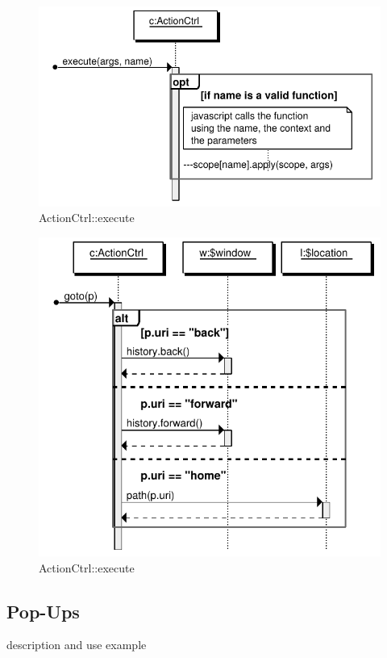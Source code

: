 \begin{figure}[htb]
    \centering
    \includegraphics{figures/design/seqdia/actionCtrl-execute.pdf}
    \caption{ActionCtrl::execute}
    \label{fig:design-seqdia-actionCtrl-execute}
\end{figure}


\begin{figure}[htb]
    \centering
    \includegraphics{figures/design/seqdia/actionCtrl-goto.pdf}
    \caption{ActionCtrl::execute}
    \label{fig:design-seqdia-actionCtrl-goto}
\end{figure}

\FloatBarrier

\subsection{Pop-Ups}
description and use example


